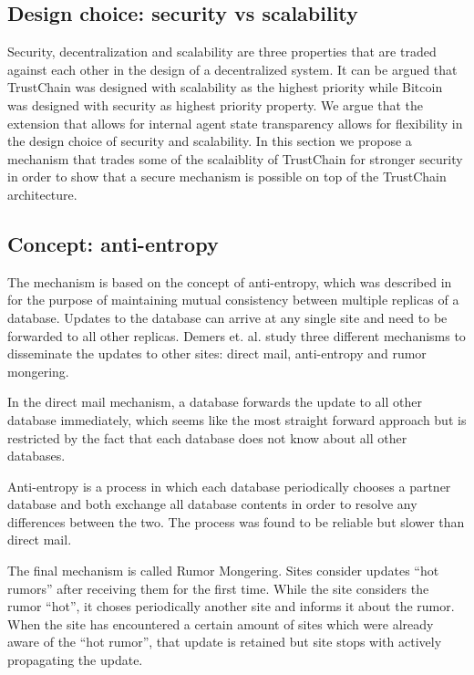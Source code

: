 \subsection{Design choice: security vs scalability}
Security, decentralization and scalability are three properties that are traded against each other 
in the design of a decentralized system. It can be argued that TrustChain was designed with scalability
as the highest priority while Bitcoin was designed with security as highest priority property. We
argue that the extension that allows for internal agent state transparency allows for flexibility in
the design choice of security and scalability. In this section we propose a mechanism that trades 
some of the scalaiblity of TrustChain for stronger security in order to show that a secure mechanism
is possible on top of the TrustChain architecture. 

\subsection{Concept: anti-entropy}
The mechanism is based on the concept of anti-entropy, which was described in \cite{demers1987epidemic}
for the purpose of maintaining mutual consistency between multiple replicas of a database. Updates
to the database can arrive at any single site and need to be forwarded to all other replicas. Demers
et. al. study three different mechanisms to disseminate the updates to other sites: direct mail, 
anti-entropy and rumor mongering.

In the direct mail mechanism, a database forwards the update to all other database immediately, which
seems like the most straight forward approach but is restricted by the fact that each database does
not know about all other databases. 

Anti-entropy is a process in which each database periodically chooses a partner database and both 
exchange all database contents in order to resolve any differences between the two. The process was
found to be reliable but slower than direct mail. 

The final mechanism is called Rumor Mongering. Sites consider updates ``hot rumors'' after receiving
them for the first time. While the site considers the rumor ``hot'', it choses periodically another
site and informs it about the rumor. When the site has encountered a certain amount of sites which
were already aware of the ``hot rumor'', that update is retained but site stops with actively
propagating the update. 

